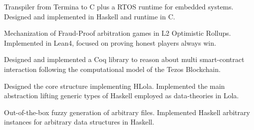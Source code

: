 


    Transpiler from Termina to C plus a RTOS runtime for embedded systems.
    Designed and implemented in Haskell and runtime in C.

    \newpage %

    Mechanization of Fraud-Proof arbitration games in L2 Optimistic Rollups.
    Implemented in Lean4, focused on proving honest players always win.

    \divider

    Designed and implemented a Coq library to reason about multi smart-contract
interaction following the computational model of the Tezos Blockchain.

    \divider

    Designed the core structure implementing HLola.
    Implemented the main abstraction lifting generic types of Haskell
employed as data-theories in Lola.

    \divider

        Out-of-the-box fuzzy generation of arbitrary files.
        Implemented Haskell arbitrary instances for arbitrary data
                structures in Haskell.

    \divider

